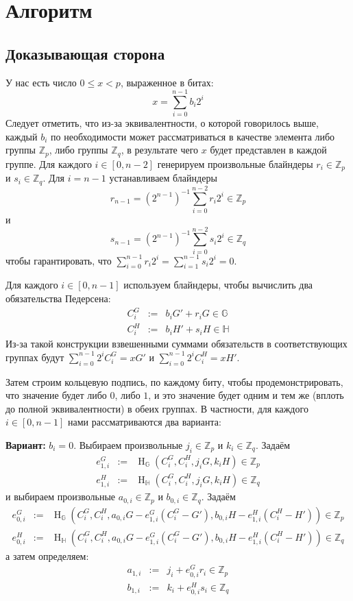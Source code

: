 \documentclass{mrl}
\newcommand{\hg}{\operatorname{H}_\mathbb{G}}
\newcommand{\hh}{\operatorname{H}_\mathbb{H}}
\newcommand{\zp}{\mathbb{Z}_p}
\newcommand{\zq}{\mathbb{Z}_q}
\begin{document}
\section{Алгоритм}
\subsection{Доказывающая сторона}
У нас есть число $0 \leq x < p$, выраженное в битах: $$x = \sum_{i=0}^{n-1} b_i2^i$$ Следует отметить, что из-за эквивалентности, о которой говорилось выше, каждый $b_i$ по необходимости может рассматриваться в качестве элемента либо группы $\zp$, либо группы $\zq$, в результате чего $x$ будет представлен в каждой группе.
Для каждого $i \in [0,n-2]$ генерируем произвольные блайндеры $r_i \in \zp$ и $s_i \in \zq$. Для $i = n-1$ устанавливаем блайндеры $$r_{n-1} = (2^{n-1})^{-1}\sum_{i=0}^{n-2} r_i2^i \in \zp$$ и $$s_{n-1} = (2^{n-1})^{-1}\sum_{i=0}^{n-2} s_i2^i \in \zq$$ чтобы гарантировать, что $\sum_{i=0}^{n-1} r_i2^i = \sum_{i=1}^{n-1} s_i2^i = 0$.

Для каждого $i \in [0,n-1]$ используем блайндеры, чтобы вычислить два обязательства Педерсена:
\begin{eqnarray*}
C_i^G &:=& b_iG' + r_iG \in \mathbb{G} \\
C_i^H &:=& b_iH' + s_iH \in \mathbb{H}
\end{eqnarray*}
Из-за такой конструкции взвешенными суммами обязательств в соответствующих группах будут \newline $\sum_{i=0}^{n-1} 2^iC_i^G = xG'$ и $\sum_{i=0}^{n-1} 2^iC_i^H = xH'$.

Затем строим кольцевую подпись, по каждому биту, чтобы продемонстрировать, что значение будет либо $0$, либо $1$, и это значение будет одним и тем же (вплоть до полной эквивалентности) в обеих группах. В частности, для каждого $i \in [0,n-1]$ нами рассматриваются два варианта:

\textbf{Вариант:} $b_i = 0$. Выбираем произвольные $j_i \in \zp$ и $k_i \in \zq$. Задаём
\begin{eqnarray*}
e_{1,i}^G &:=& \hg\left( C_i^G, C_i^H, j_iG, k_iH \right) \in \zp \\
e_{1,i}^H &:=& \hh\left( C_i^G, C_i^H, j_iG, k_iH \right) \in \zq
\end{eqnarray*}
и выбираем произвольные $a_{0,i} \in \zp$ и $b_{0,i} \in \zq$. Задаём
\begin{eqnarray*}
e_{0,i}^G &:=& \hg\left( C_i^G, C_i^H, a_{0,i}G - e_{1,i}^G(C_i^G-G'), b_{0,i}H - e_{1,i}^H(C_i^H-H') \right) \in \zp \\
e_{0,i}^H &:=& \hh\left( C_i^G, C_i^H, a_{0,i}G - e_{1,i}^G(C_i^G-G'), b_{0,i}H - e_{1,i}^H(C_i^H-H') \right) \in \zq
\end{eqnarray*}
а затем определяем:
\begin{eqnarray*}
a_{1,i} &:=& j_i + e_{0,i}^Gr_i \in \zp \\
b_{1,i} &:=& k_i + e_{0,i}^Hs_i \in \zq
\end{eqnarray*}
\end{document}
